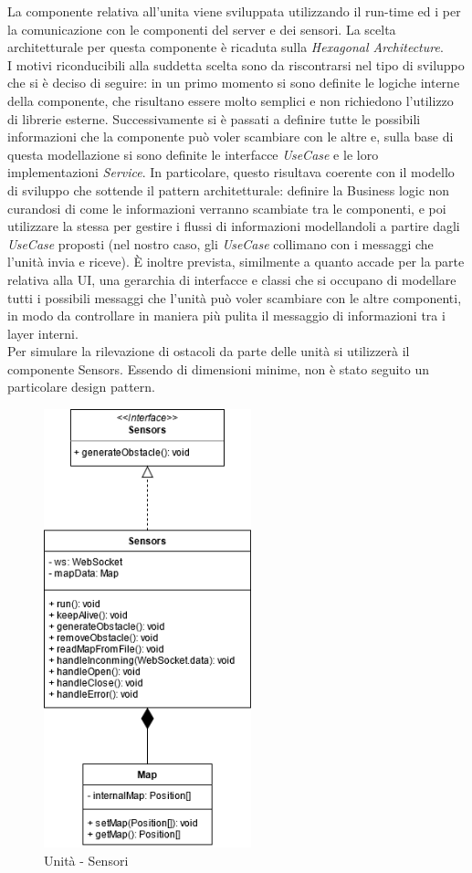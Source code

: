 La componente relativa all'unita viene sviluppata utilizzando il run-time  ed i  per la comunicazione con le componenti del server e dei sensori.
La scelta architetturale per questa componente è ricaduta sulla \textit{Hexagonal Architecture}. \\
I motivi riconducibili alla suddetta scelta sono da riscontrarsi nel tipo di sviluppo che si è deciso di seguire: in un primo momento si sono definite le logiche interne della componente, che risultano essere molto semplici e non richiedono l'utilizzo di librerie esterne. Successivamente si è passati a definire tutte le possibili informazioni che la componente può voler scambiare con le altre e, sulla base di questa modellazione si sono definite le interfacce \textit{UseCase} e le loro implementazioni \textit{Service}. In particolare, questo risultava coerente con il modello di sviluppo che sottende il pattern architetturale: definire la Business logic non curandosi di come le informazioni verranno scambiate tra le componenti, e poi utilizzare la stessa per gestire i flussi di informazioni modellandoli a partire dagli \textit{UseCase} proposti (nel nostro caso, gli \textit{UseCase} collimano con i messaggi che l'unità invia e riceve).
È inoltre prevista, similmente a quanto accade per la parte relativa alla UI, una gerarchia di interfacce e classi che si occupano di modellare tutti i possibili messaggi che l'unità può voler scambiare con le altre componenti, in modo da controllare in maniera più pulita il messaggio di informazioni tra i layer interni. \\
Per simulare la rilevazione di ostacoli da parte delle unità si utilizzerà il componente Sensors. Essendo di dimensioni minime, non è stato seguito un particolare design pattern.

\begin{figure}[H]
	\centering
	\includegraphics[width=6cm]{img/unit_sensori.png}
	\caption{Unità - Sensori}
\end{figure}

